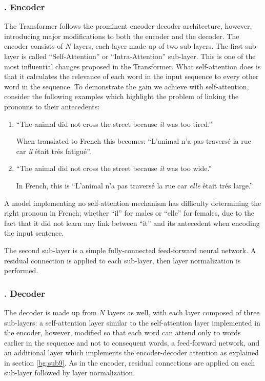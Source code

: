 \subsubsection{. Encoder} 
\label{bg:subsub12}

The Transformer follows the prominent encoder-decoder architecture, however, introducing major modifications to both the encoder and the decoder. The encoder consists of $N$ layers, each layer made up of two sub-layers. The first sub-layer is called  \enquote{Self-Attention} or \enquote{Intra-Attention} sub-layer. This is one of the most influential changes proposed in the Transformer. What self-attention does is that it calculates the relevance of each word in the input sequence to every other word in the sequence. To demonstrate the gain we achieve with self-attention, consider the following examples which highlight the problem of linking the pronouns to their antecedents:
\begin{enumerate}
	\item \enquote{The animal did not cross the street because \textit{it} was too tired.}
	
	
	
	When translated to French this becomes: \enquote{L'animal n'a pas travers\'e la rue car \textit{il} \'etait tr\'es fatigu\'e}. 
	\item \enquote{The animal did not cross the street because \textit{it} was too wide.} 
	
	
	In French, this is  \enquote{L'animal n'a pas travers\'e la rue car \textit{elle} \'etait tr\'es large.}
\end{enumerate}


A model implementing no self-attention mechanism has difficulty determining the right pronoun in French; whether \enquote{il} for males or \enquote{elle} for females, due to the fact that it did not learn any link between \enquote{it} and its antecedent when encoding the input sentence.


The second sub-layer is a simple fully-connected feed-forward neural network. A residual connection \cite{he2016deep} is applied to each sub-layer, then layer normalization \cite{ba2016layer} is performed.


\subsubsection{. Decoder} 
\label{bg:subsub13}
The decoder is made up from $N$ layers as well, with each layer composed of three sub-layers: a self-attention layer similar to the self-attention layer implemented in the encoder, however, modified so that each word can attend only to words earlier in the sequence and not to consequent words, a feed-forward network, and an additional layer which implements the encoder-decoder attention as explained in section \ref{bg:sub9}. As in the encoder, residual connections are applied on each sub-layer followed by layer normalization.



